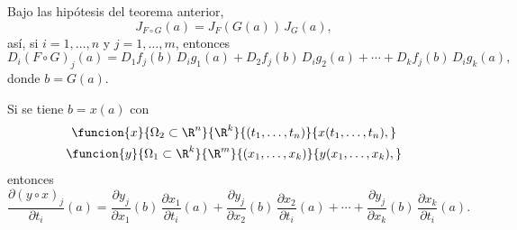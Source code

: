 \documentclass[a4,11pt]{aleph-notas}
\begin{document}
\begin{prop}
    Bajo las hipótesis del teorema anterior,
    \[
        J_{F\circ G}(a) = J_F(G(a))\, J_G(a),
    \]
    así, si $i=1,\ldots,n$ y $j=1,\ldots,m$, entonces
    \[
        D_i (F\circ G)_j(a) = D_1 f_j(b)\, D_i g_1(a) + D_2 f_j(b)\, D_i g_2(a) + \cdots + D_k f_j(b)\, D_i g_k(a),
    \]
    donde $b=G(a)$.
\end{prop}

\begin{advertencia}
    Si se tiene $b=x(a)$ con
    \begin{gather*}
        \funcion{x}{\Omega_2\subset \R^n}{\R^k}{(t_1,\ldots,t_n)}{x(t_1,\ldots,t_n),}\\
        \funcion{y}{\Omega_1\subset \R^k}{\R^m}{(x_1,\ldots,x_k)}{y(x_1,\ldots,x_k),}
    \end{gather*}
    entonces
    \[
        \frac{\partial (y\circ x)_j}{\partial t_i}(a)
            = \frac{\partial y_j}{\partial x_1}(b)\,\frac{\partial x_1}{\partial t_i}(a)
            + \frac{\partial y_j}{\partial x_2}(b)\,\frac{\partial x_2}{\partial t_i}(a)
            + \cdots
            + \frac{\partial y_j}{\partial x_k}(b)\,\frac{\partial x_k}{\partial t_i}(a).
    \]
\end{advertencia}
\end{document}
